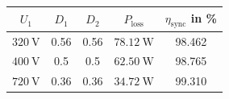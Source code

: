 
\begin{solutiontable}[ht]
	\centering  %
	\begin{tabular}{ccccc}
		\toprule
		\multicolumn{1}{c}{$U_\mathrm{1}$} & \multicolumn{1}{c}{$D_1$}             &
		\multicolumn{1}{c}{$D_2$}          & \multicolumn{1}{c}{$P_\mathrm{loss}$} &
		\multicolumn{1}{c}{$\eta_\mathrm{sync} $ in \%}                                                                  \\
		\midrule
		$\SI{320}{\volt}$                  & 0.56                                  & 0.56 & $\SI{78.12}{\watt}$ & 98.462 \\
		$\SI{400}{\volt}$                  & 0.5                                   & 0.5  & $\SI{62.50}{\watt}$ & 98.765 \\
		$\SI{720}{\volt}$                  & 0.36                                  & 0.36 & $\SI{34.72}{\watt}$ & 99.310 \\
		\bottomrule
	\end{tabular}
	\caption{Duty cycles, power loss and $\eta_\mathrm{sync}$ as fct. of $U_\mathrm{1}$.}
	\label{table:PowerlossDutyCycleEfficiencySync}
\end{solutiontable}
